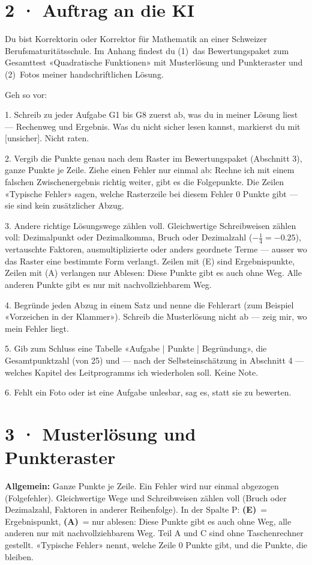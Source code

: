 \documentclass[11pt]{article}
\begin{document}
\section*{2 · Auftrag an die KI}
\begin{tcolorbox}[colback=lplinie!25,colframe=lplinie,boxrule=0.5pt,arc=1mm,fontupper=\small]
Du bist Korrektorin oder Korrektor für Mathematik an einer Schweizer Berufsmaturitätsschule. Im Anhang findest du (1)~das Bewertungspaket zum Gesamttest «Quadratische Funktionen» mit Musterlösung und Punkteraster und (2)~Fotos meiner handschriftlichen Lösung.\par\medskip
Geh so vor:\par
1. Schreib zu jeder Aufgabe G1 bis G8 zuerst ab, was du in meiner Lösung liest — Rechenweg und Ergebnis. Was du nicht sicher lesen kannst, markierst du mit [unsicher]. Nicht raten.\par
2. Vergib die Punkte genau nach dem Raster im Bewertungspaket (Abschnitt 3), ganze Punkte je Zeile. Ziehe einen Fehler nur einmal ab: Rechne ich mit einem falschen Zwischenergebnis richtig weiter, gibt es die Folgepunkte. Die Zeilen «Typische Fehler» sagen, welche Rasterzeile bei diesem Fehler 0 Punkte gibt — sie sind kein zusätzlicher Abzug.\par
3. Andere richtige Lösungswege zählen voll. Gleichwertige Schreibweisen zählen voll: Dezimalpunkt oder Dezimalkomma, Bruch oder Dezimalzahl ($-\tfrac14 = -0.25$), vertauschte Faktoren, ausmultiplizierte oder anders geordnete Terme — ausser wo das Raster eine bestimmte Form verlangt. Zeilen mit (E) sind Ergebnispunkte, Zeilen mit (A) verlangen nur Ablesen: Diese Punkte gibt es auch ohne Weg. Alle anderen Punkte gibt es nur mit nachvollziehbarem Weg.\par
4. Begründe jeden Abzug in einem Satz und nenne die Fehlerart (zum Beispiel «Vorzeichen in der Klammer»). Schreib die Musterlösung nicht ab — zeig mir, wo mein Fehler liegt.\par
5. Gib zum Schluss eine Tabelle «Aufgabe | Punkte | Begründung», die Gesamtpunktzahl (von 25) und — nach der Selbsteinschätzung in Abschnitt 4 — welches Kapitel des Leitprogramms ich wiederholen soll. Keine Note.\par
6. Fehlt ein Foto oder ist eine Aufgabe unlesbar, sag es, statt sie zu bewerten.
\end{tcolorbox}

\section*{3 · Musterlösung und Punkteraster}
\textbf{Allgemein:} Ganze Punkte je Zeile. Ein Fehler wird nur einmal abgezogen (Folgefehler). Gleichwertige Wege und
Schreibweisen zählen voll (Bruch oder Dezimalzahl, Faktoren in anderer Reihenfolge). In der Spalte P: \textbf{(E)}~= Ergebnispunkt,
\textbf{(A)}~= nur ablesen: Diese Punkte gibt es auch ohne Weg, alle anderen nur mit nachvollziehbarem Weg.
Teil A und C sind ohne Taschenrechner gestellt. «Typische Fehler» nennt, welche Zeile 0 Punkte gibt, und die Punkte, die bleiben.
\end{document}
